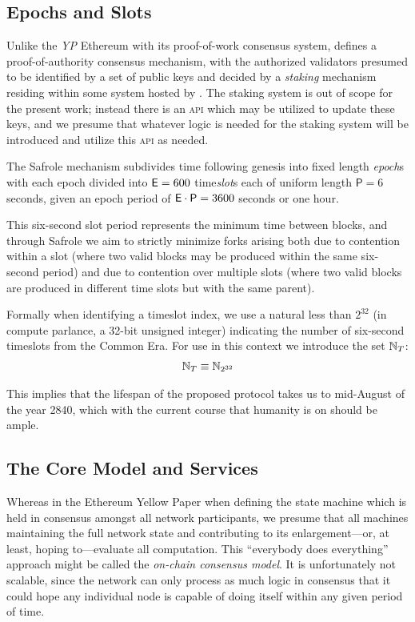 \subsection{Epochs and Slots}\label{sec:epochsandslots}

Unlike the \emph{YP} Ethereum with its proof-of-work consensus system, \Jam defines a proof-of-authority consensus mechanism, with the authorized validators presumed to be identified by a set of public keys and decided by a \emph{staking} mechanism residing within some system hosted by \Jam. The staking system is out of scope for the present work; instead there is an \textsc{api} which may be utilized to update these keys, and we presume that whatever logic is needed for the staking system will be introduced and utilize this \textsc{api} as needed.

The Safrole mechanism subdivides time following genesis into fixed length \emph{epoch}s with each epoch divided into $\mathsf{E} = 600$ time\emph{slot}s each of uniform length $\mathsf{P} = 6$ seconds, given an epoch period of $\mathsf{E}\cdot\mathsf{P} = 3600$ seconds or one hour.

This six-second slot period represents the minimum time between \Jam blocks, and through Safrole we aim to strictly minimize forks arising both due to contention within a slot (where two valid blocks may be produced within the same six-second period) and due to contention over multiple slots (where two valid blocks are produced in different time slots but with the same parent).

Formally when identifying a timeslot index, we use a natural less than $2^{32}$ (in compute parlance, a 32-bit unsigned integer) indicating the number of six-second timeslots from the \Jam Common Era. For use in this context we introduce the set $\mathbb{N}_T$:
\begin{align}\label{eq:time}
  \mathbb{N}_T \equiv \mathbb{N}_{2^{32}}
\end{align}

This implies that the lifespan of the proposed protocol takes us to mid-August of the year 2840, which with the current course that humanity is on should be ample.

\subsection{The Core Model and Services}\label{sec:coremodelandservices}

Whereas in the Ethereum Yellow Paper when defining the state machine which is held in consensus amongst all network participants, we presume that all machines maintaining the full network state and contributing to its enlargement---or, at least, hoping to---evaluate all computation. This ``everybody does everything'' approach might be called the \emph{on-chain consensus model}. It is unfortunately not scalable, since the network can only process as much logic in consensus that it could hope any individual node is capable of doing itself within any given period of time.

